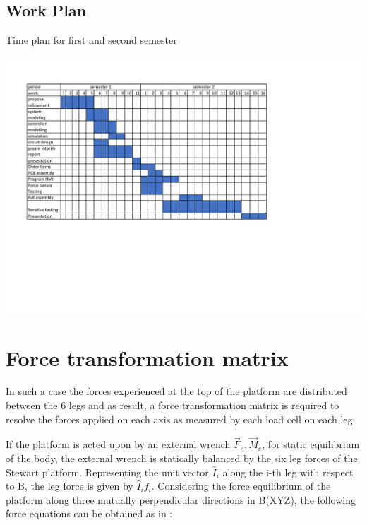  \subsection{Work Plan}
 \begin{center}
 \begin{table}[!h]
 \centering
 \caption[Time plan]{Time plan for first and second semester}
 \paragraph{ }
 \includegraphics[width=0.95\linewidth]{Figures/workplan}
 \end{table}
 \end{center}
 \clearpage
 
\section{Force transformation matrix} 
In such a case the forces experienced at the top of the platform are distributed between the 6 legs and as result, a force transformation matrix is required to resolve the forces applied on each axis as measured by each load cell on each leg. 

If the platform is acted upon by an external wrench {$\vec{F}_e, \vec{M}_e$}, for static equilibrium of the body, the external wrench is statically balanced by the six leg forces of the Stewart platform. Representing the unit vector $\hat{I}_i$ along the i-th leg with respect to B, the leg force is given  by $\hat{I}_if_i$. Considering the force equilibrium of the platform along  three mutually perpendicular directions in B(XYZ), the following force equations can be obtained as in \cite{dwarakanath_design_2001}:

